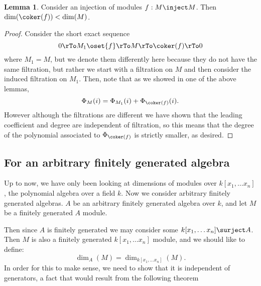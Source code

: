 \documentclass[12 pt]{article}
\theoremstyle{definition}
\newtheorem{lemma}[theorem]{Lemma}
\begin{document}
\begin{lemma} Consider an injection of modules $f:M \inject M$. Then $\dim(\coker(f))<\dim(M)$.
\label{dimmodf}
\end{lemma}
\begin{proof} Consider the short exact sequence
\[0 \rTo M_1 \oset{f}\rTo M \rTo \coker(f) \rTo 0\]
where $M_1=M$, but we denote them differently here because they do not have the same filtration, but rather we start with a filtration on $M$ and then consider the induced filtration on $M_1$. Then, note that as we showed in one of the above lemmas,
\[\Phi_M(i)=\Phi_{M_1}(i)+\Phi_{\coker(f)}(i).\]
However although the filtrations are different we have shown that the leading coefficient and degree are independent of filtration, so this means that the degree of the polynomial associated to $\Phi_{\coker(f)}$ is strictly smaller, as desired.
\end{proof}



\subsection{For an arbitrary finitely generated algebra}

Up to now, we have only been looking at dimensions of modules over $k[x_1, \ldots x_n]$, the polynomial algebra over a field $k$. Now we consider arbitrary finitely generated algebras. $A$ be an arbitrary finitely generated algebra over $k$, and let $M$ be a finitely generated $A$ module.

Then since $A$ is finitely generated we may consider some $k[x_1, \ldots x_n] \surject A$. Then $M$ is also a finitely generated $k[x_1, \ldots x_n]$ module, and we should like to define:
\[\dim_A(M)=\dim_{k[x_1, \ldots x_n]}(M).\]
In order for this to make sense, we need to show that it is independent of generators, a fact that would result from the following theorem
\end{document}

